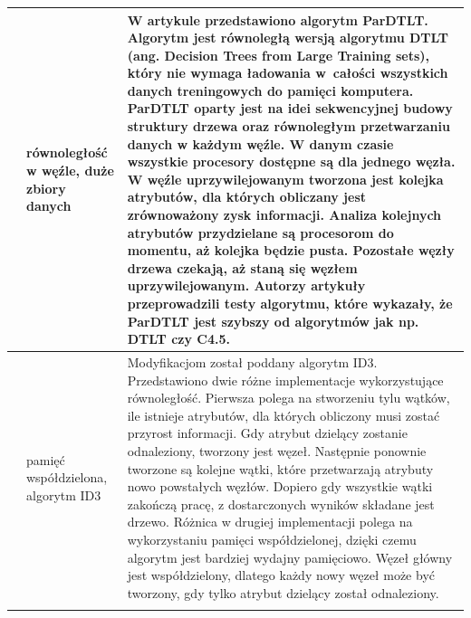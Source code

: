 \documentclass[12pt]{article}
\begin{document}
\begin{center}
\begin{longtable}{| c | p{} | p{} |}
            \hline

            \cite{parallel-algorithm-to-induce-decision-trees} &

            równoległość w węźle, duże zbiory danych &

            W artykule przedstawiono algorytm ParDTLT. Algorytm jest równoległą wersją algorytmu
            DTLT (ang. Decision Trees from Large Training sets), który nie wymaga ładowania w~całości wszystkich danych
            treningowych do pamięci komputera. ParDTLT oparty jest na idei sekwencyjnej budowy struktury
            drzewa oraz równoległym przetwarzaniu danych w każdym węźle. W danym czasie wszystkie procesory
            dostępne są dla jednego węzła. W węźle uprzywilejowanym tworzona jest kolejka atrybutów, dla
            których obliczany jest zrównoważony zysk informacji. Analiza kolejnych
            atrybutów przydzielane są procesorom do momentu, aż kolejka będzie pusta. Pozostałe węzły drzewa czekają, aż
            staną się węzłem uprzywilejowanym. Autorzy artykuły przeprowadzili testy algorytmu, które wykazały, że
            ParDTLT jest szybszy od algorytmów jak np. DTLT czy C4.5. \\

            \hline

            \cite{improved-id3-decision-tree} &

            pamięć \newline współdzielona, algorytm ID3 &

            Modyfikacjom został poddany algorytm ID3. Przedstawiono dwie różne implementacje wykorzystujące równoległość.
            Pierwsza polega na stworzeniu tylu wątków, ile istnieje atrybutów, dla których obliczony musi zostać
            przyrost informacji. Gdy atrybut dzielący zostanie odnaleziony, tworzony jest węzeł. Następnie ponownie
            tworzone są kolejne wątki, które przetwarzają atrybuty nowo powstałych węzłów. Dopiero gdy wszystkie wątki
            zakończą pracę, z dostarczonych wyników składane jest drzewo. Różnica w drugiej implementacji polega na 
            wykorzystaniu pamięci współdzielonej, dzięki czemu algorytm jest bardziej wydajny pamięciowo. 
            Węzeł główny jest współdzielony, dlatego każdy nowy węzeł może być tworzony, gdy tylko atrybut dzielący
            został odnaleziony. \\
            
            \hline
            
            \cite{research-parallel-map-reduce} &


\end{longtable}
\end{center}
\end{document}
